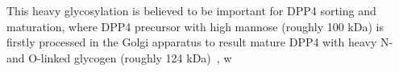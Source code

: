 This heavy glycosylation is believed to be important for DPP4 sorting and maturation, where DPP4 precursor with high mannose (roughly 100 kDa) is firstly processed in the Golgi apparatus to result mature DPP4 with heavy N- and O-linked glycogen (roughly 124 kDa)~\cite{Matter_1991}, w